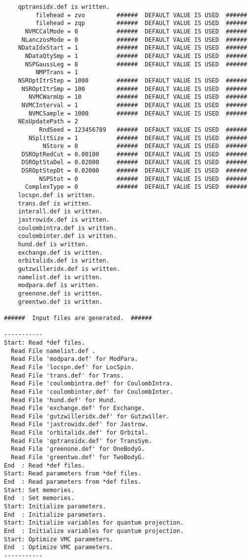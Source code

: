 \begin{verbatim}
    qptransidx.def is written.
         filehead = zvo         ######  DEFAULT VALUE IS USED  ######
         filehead = zqp         ######  DEFAULT VALUE IS USED  ######
      NVMCCalMode = 0           ######  DEFAULT VALUE IS USED  ######
     NLanczosMode = 0           ######  DEFAULT VALUE IS USED  ######
    NDataIdxStart = 1           ######  DEFAULT VALUE IS USED  ######
      NDataQtySmp = 1           ######  DEFAULT VALUE IS USED  ######
      NSPGaussLeg = 8           ######  DEFAULT VALUE IS USED  ######
         NMPTrans = 1         
    NSROptItrStep = 1000        ######  DEFAULT VALUE IS USED  ######
     NSROptItrSmp = 100         ######  DEFAULT VALUE IS USED  ######
       NVMCWarmUp = 10          ######  DEFAULT VALUE IS USED  ######
     NVMCInterval = 1           ######  DEFAULT VALUE IS USED  ######
       NVMCSample = 1000        ######  DEFAULT VALUE IS USED  ######
    NExUpdatePath = 2         
          RndSeed = 123456789   ######  DEFAULT VALUE IS USED  ######
       NSplitSize = 1           ######  DEFAULT VALUE IS USED  ######
           NStore = 0           ######  DEFAULT VALUE IS USED  ######
     DSROptRedCut = 0.00100     ######  DEFAULT VALUE IS USED  ######
     DSROptStaDel = 0.02000     ######  DEFAULT VALUE IS USED  ######
     DSROptStepDt = 0.02000     ######  DEFAULT VALUE IS USED  ######
          NSPStot = 0           ######  DEFAULT VALUE IS USED  ######
      ComplexType = 0           ######  DEFAULT VALUE IS USED  ######
    locspn.def is written.
    trans.def is written.
    interall.def is written.
    jastrowidx.def is written.
    coulombintra.def is written.
    coulombinter.def is written.
    hund.def is written.
    exchange.def is written.
    orbitalidx.def is written.
    gutzwilleridx.def is written.
    namelist.def is written.
    modpara.def is written.
    greenone.def is written.
    greentwo.def is written.

######  Input files are generated.  ######

-----------
Start: Read *def files.
  Read File namelist.def .
  Read File 'modpara.def' for ModPara.
  Read File 'locspn.def' for LocSpin.
  Read File 'trans.def' for Trans.
  Read File 'coulombintra.def' for CoulombIntra.
  Read File 'coulombinter.def' for CoulombInter.
  Read File 'hund.def' for Hund.
  Read File 'exchange.def' for Exchange.
  Read File 'gutzwilleridx.def' for Gutzwiller.
  Read File 'jastrowidx.def' for Jastrow.
  Read File 'orbitalidx.def' for Orbital.
  Read File 'qptransidx.def' for TransSym.
  Read File 'greenone.def' for OneBodyG.
  Read File 'greentwo.def' for TwoBodyG.
End  : Read *def files.
Start: Read parameters from *def files.
End  : Read parameters from *def files.
Start: Set memories.
End  : Set memories.
Start: Initialize parameters.
End  : Initialize parameters.
Start: Initialize variables for quantum projection.
End  : Initialize variables for quantum projection.
Start: Optimize VMC parameters.
End  : Optimize VMC parameters.
-----------
\end{verbatim}
\normalsize

